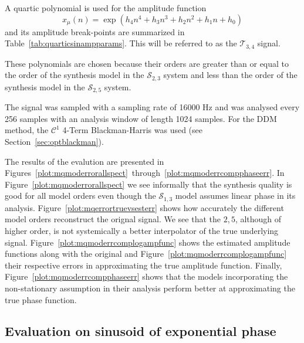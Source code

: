 A quartic polynomial is used for the amplitude function
\[
    x_{\mu}(n) = \exp \left(h_4 n^{4} + h_3 n^{3} + h_2 n^{2} + h_1 n + h_0 \right)
\]
and its amplitude break-points are summarized in
Table~\ref{tab:quarticsinampparams}. This will be referred to as the
$\mathscr{T}_{3,4}$ signal.

These polynomials are chosen because their orders are greater than or equal to
the order of the synthesis model in the $\mathscr{S}_{2,3}$ system and less than
the order of the synthesis model in the $\mathscr{S}_{2,5}$ system.

The signal was sampled with a sampling rate of 16000 Hz and was analysed every
256 samples with an analysis window of length 1024 samples. For the DDM method, the
$\mathcal{C}^{1}$ 4-Term Blackman-Harris was used (see
Section~\ref{sec:optblackman}).

The results of the evalution are presented in
Figures~\ref{plot:mqmoderrorallspect}~through~\ref{plot:mqmoderrcompphaseerr}.
In Figure~\ref{plot:mqmoderrorallspect} we see informally that the synthesis
quality is good for all model orders even though the $\mathscr{S}_{1,3}$ model
assumes linear phase in its analysis. Figure~\ref{plot:mqerrortruevsesterr}
shows how accurately the different model orders reconstruct the orignal signal.
We see that the $\mathscr{2,5}$, although of higher order, is not systemically a
better interpolator of the true underlying signal.
Figure~\ref{plot:mqmoderrcomplogampfunc} shows the estimated amplitude functions
along with the original and Figure~\ref{plot:mqmoderrcomplogampfunc} their
respective errors in approximating the true amplitude function.  Finally,
Figure~\ref{plot:mqmoderrcompphaseerr} shows that the models incorporating the
non-stationary assumption in their analysis perform better at approximating the
true phase function. 


\subsection{Evaluation on sinusoid of exponential phase \label{sec:evalexpphase}}

